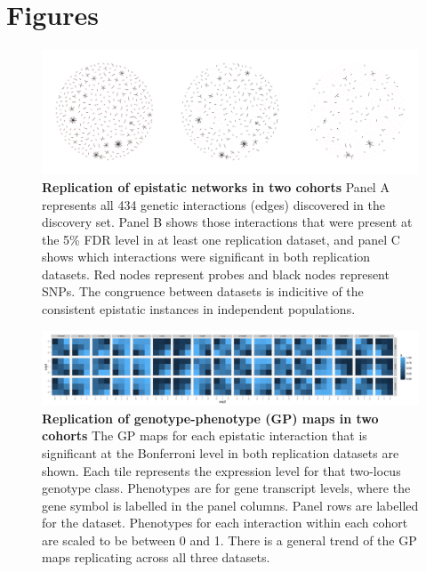 \documentclass{article}
\begin{document}
\clearpage
\section{Figures}

\begin{figure}[H]
	\includegraphics[width=5in]{hairballs_all_reps.pdf}
	\caption{\textbf{Replication of epistatic networks in two cohorts} Panel A represents all 434 genetic interactions (edges) discovered in the discovery set. Panel B shows those interactions that were present at the 5\% FDR level in at least one replication dataset, and panel C shows which interactions were significant in both replication datasets. Red nodes represent probes and black nodes represent SNPs. The congruence between datasets is indicitive of the consistent epistatic instances in independent populations.}
	\label{fig:fireworks}
\end{figure}
\clearpage

\begin{figure}[H]
	\includegraphics[width=5in]{gpbonfrep.pdf}
	\caption{\textbf{Replication of genotype-phenotype (GP) maps in two cohorts} The GP maps for each epistatic interaction that is significant at the Bonferroni level in both replication datasets are shown. Each tile represents the expression level for that two-locus genotype class. Phenotypes are for gene transcript levels, where the gene symbol is labelled in the panel columns. Panel rows are labelled for the dataset. Phenotypes for each interaction within each cohort are scaled to be between 0 and 1. There is a general trend of the GP maps replicating across all three datasets.}
	\label{fig:gpmaps}
\end{figure}
\clearpage
\end{document}
